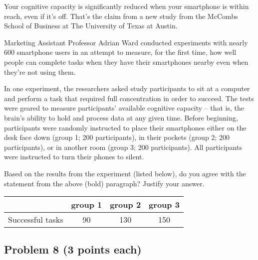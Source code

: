 \documentclass[12pt]{article}
\begin{document}
Your cognitive capacity is significantly reduced when your smartphone is within reach, even if it's off. That's the claim from a new study from the McCombs School of Business at The University of Texas at Austin.

\vspace{0.1cm}
\noindent Marketing Assistant Professor Adrian Ward conducted experiments with nearly 600 smartphone users in an attempt to measure, for the first time, how well people can complete tasks when they have their smartphones nearby even when they're not using them.

\vspace{0.1cm}
\noindent In one experiment, the researchers asked study participants to sit at a computer and perform a task that required full concentration in order to succeed. The tests were geared to measure participants' available cognitive capacity -- that is, the brain's ability to hold and process data at any given time. Before beginning, participants were randomly instructed to place their smartphones either on the desk face down (group 1; 200 participants), in their pockets (group 2; 200 participants), or in another room (group 3; 200 participants).  All participants were instructed to turn their phones to silent.

\vspace{0.1cm}

\vspace{0.2cm}
\noindent Based on the results from the experiment (listed below), do you agree with the statement from the above (bold) paragraph? Justify your answer.

\vspace{0.5cm}

\begin{tabular}{|l|c|c|c|}
\hline
&group 1 & group 2 & group 3 \\
\hline
Successful tasks & 90& 130& 150\\
\hline
\end{tabular}


\newpage 
\subsection*{Problem 8 (3 points each)}
\end{document}
